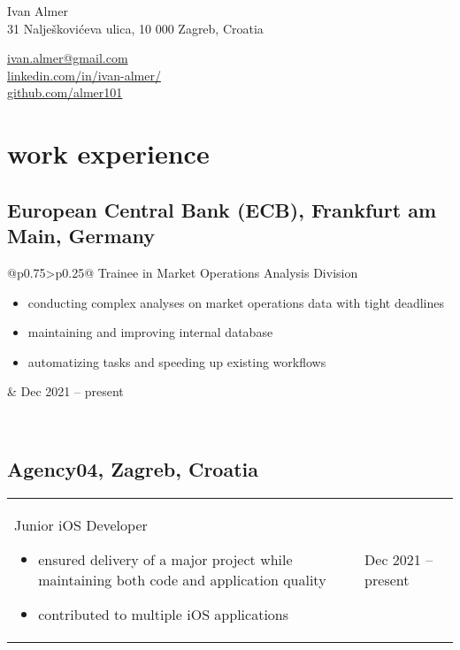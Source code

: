 \documentclass[a4paper]{article}
\makeatletter
\newlength{\tablewidth}
\newenvironment{period}[2]{%
\newcommand{\sarma}{#2}%
\setlength{\tablewidth}{\linewidth}
\addtolength{\tablewidth}{-2\tabcolsep}
\begin{tabular}{@{}p{0.75\tablewidth}>{\raggedleft\arraybackslash}p{0.25\tablewidth}@{}}%
#1 \newline
\begin{itemize}
}{%
\end{itemize} & \sarma \\%
\end{tabular}\\
}
\makeatother
\begin{document}
\fontfamily{\sfdefault}
\selectfont

\begin{minipage}{.5\textwidth}
\LARGE{Ivan Almer}\\
\normalsize{31 Nalješkovićeva ulica, 10 000 Zagreb, Croatia}
\end{minipage}%
\begin{minipage}{.5\textwidth}
\raggedleft
\href{mailto:ivan.almer@gmail.com}{ivan.almer@gmail.com} \\
\href{https://www.linkedin.com/in/ivan-almer/}{linkedin.com/in/ivan-almer/} \\
\href{https://github.com/almer101}{github.com/almer101} \\
\end{minipage}

\vspace{1em}

\section{work experience}
\subsection{European Central Bank (ECB), Frankfurt am Main, Germany}
\begin{period}{Trainee in Market Operations Analysis Division}{Dec 2021 -- present}
        \item 
            conducting complex analyses on market operations data with tight deadlines
        \item
            maintaining and improving internal database
        \item 
            automatizing tasks and speeding up existing workflows
\end{period}

\subsection{Agency04, Zagreb, Croatia}
\begin{period}{Junior iOS Developer}{Jul 2018 -- Feb 2021}
    \item
        ensured delivery of a major project while maintaining both code and application quality
    \item
        contributed to multiple iOS applications
\end{period}
\end{document}
